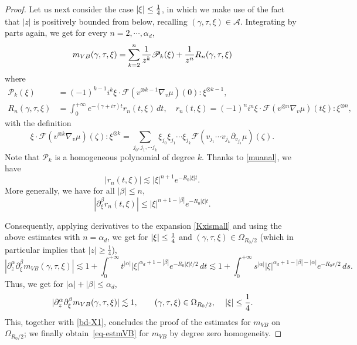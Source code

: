 \documentclass[11pt]{amsart}
\numberwithin{equation}{section}
\begin{document}
\begin{proof}
Let us next consider the case  $|\xi| \leq { 1 \over 4}$, in which we make use of the fact that $|z|$ is positively  bounded from below, recalling $(\gamma,  \tau, \xi) \in \mathcal{A}$. Integrating by parts again, we get for every $n = 2,\cdots, \alpha_d$,
   \begin{equation}
   \label{Kxismall}
    m_{VB}(\gamma, \tau, \xi)=  \sum_{k= 2}^n
     { 1 \over z^k}  \mathscr{P}_{k}(\xi)   +   { 1 \over z^n} R_{n}(\gamma, \tau, \xi)
    \end{equation} 
     where
     $$\begin{aligned} \mathscr{P}_{k}(\xi)&= (-1)^{k-1}i^k \xi \cdot \mathcal{F}\left( v^{\otimes k-1}\nabla_{v} \mu \right) (0): \xi^{\otimes k-1}, \\
       R_{n}(\gamma, \tau, \xi) &=  \int_{0}^{+ \infty} e^{-(\gamma + i \tau) t} r_{n}(t,\xi)\, dt, \quad r_{n}(t,\xi)=
      (-1)^n i^n \xi\cdot \mathcal{F}\left(v^{\otimes n}\nabla_{v} \mu\right) (t\xi):\xi^{\otimes n},
       \end{aligned}
       $$
        with the definition
  $$ \xi \cdot  \mathcal{F}(v^{\otimes k} \nabla_{v} \mu)(\zeta): \xi^{\otimes k}= \sum_{j_{0}, j_{1}, \cdots j_{k}}
  \xi_{j_{0}}  \xi_{j_{1}} \cdots \xi_{j_{k}} \mathcal{F}( v_{j_{1}}\cdots v_{j_{k}} \partial_{v_{j_{0}}} \mu)(\zeta).$$
     Note that $\mathscr{P}_{k}$ is a homogeneous polynomial of degree $k$.  Thanks to \eqref{muanal}, we have
   $$  | r_{n}(t, \xi) |
    \lesssim  |\xi|^{n+1} e^{ - R_{0} | \xi| t }.$$
 More generally,  we have for all $|\beta|\le n$, 
    $$  |\partial_{\xi}^\beta  r_{n}(t, \xi) | \leq  |\xi|^{n+1- |\beta |} e^{ - R_{0} | \xi| t }.$$

   Consequently, applying derivatives  to the expansion  \eqref{Kxismall} and using the above estimates with $n=\alpha_d$, we get for $|\xi| \leq { 1 \over 4}$
    and $(\gamma, \tau, \xi) \in \Omega_{R_{0}/2}$ (which in particular implies that $|z|\ge \frac14$), 
    $$  | \partial_{z}^\alpha \partial_{\xi}^\beta m_{VB}(\gamma, \tau, \xi) | \lesssim 
     1 +  \int_{0}^{+ \infty}  t^{|\alpha|} |\xi|^{\alpha_d+1- | \beta|} e^{ - R_{0} | \xi| t /2}\, dt
      \lesssim 1 +  \int_{0}^{+ \infty}  s^{|\alpha|} |\xi|^{\alpha_d + 1- | \beta| - |\alpha |}  e^{ - R_{0} s /2}\, ds.$$
 Thus, we get for $| \alpha| + |\beta | \leq   \alpha_d$,
   $$  | \partial_{z}^\alpha \partial_{\xi}^\beta m_{VB}(\gamma, \tau, \xi) | \lesssim 
     1, \qquad  (\gamma, \tau, \xi) \in \Omega_{R_{0}/2}, \, \quad
      | \xi | \leq { 1 \over 4}.$$        
      This, together with \eqref{bd-X1}, concludes the proof of the estimates for $m_{VB}$ on $\Omega_{R_0/2}$;
      we finally obtain~\eqref{eq-estmVB} for $m_{VB}$ by degree zero homogeneity.
      

\end{proof}
\end{document}
